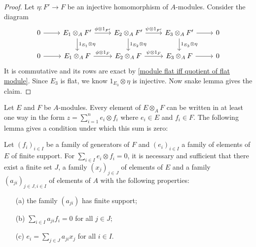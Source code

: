 \begin{proof}
Let $\eta:F'\to F$ be an injective homomorphism of $A$-modules. Consider the diagram
\[\begin{tikzcd}
0\ar[r]&E_1\otimes_AF'\ar[r,"\phi\otimes 1_{F'}"]\ar[d,"1_{E_1}\otimes\eta"]&E_2\otimes_AF'\ar[r,"\psi\otimes 1_{F'}"]\ar[d,"1_{E_2}\otimes\eta"]&E_3\otimes_AF'\ar[r]\ar[d,"1_{E_3}\otimes\eta"]&0\\
0\ar[r]&E_1\otimes_AF\ar[r,"\phi\otimes 1_{F}"]&E_2\otimes_AF\ar[r,"\psi\otimes 1_{F}"]&E_3\otimes_AF\ar[r]&0
\end{tikzcd}\]
It is commutative and its rows are exact by \cref{module flat iff quotient of flat module}. Since $E_3$ is flat, we know $1_{E_3}\otimes\eta$ is injective. Now snake lemma gives the claim.
\end{proof}
Let $E$ and $F$ be $A$-modules. Every element of $E\otimes_AF$ can be written in at least one way in the form $z=\sum_{i=1}^{n}e_i\otimes f_i$ where $e_i\in E$ and $f_i\in F$. The following lemma gives a condition under which this sum is zero:
\begin{lemma}\label{module tensor zero iff}
Let $(f_i)_{i\in I}$ be a family of generators of $F$ and $(e_i)_{i\in I}$ a family of elements of $E$ of finite support. For $\sum_{i\in I}e_i\otimes f_i=0$, it is necessary and sufficient that there exist a finite set $J$, a family $(x_j)_{j\in J}$ of elements of $E$ and a family $(a_{ji})_{j\in J,i\in I}$ of elements of $A$ with the following properties:
\begin{itemize}
\item[(a)] the family $(a_{ji})$ has finite support;
\item[(b)] $\sum_{i\in I}a_{ji}f_i=0$ for all $j\in J$;
\item[(c)] $e_i=\sum_{j\in J}a_{ji}x_j$ for all $i\in I$.
\end{itemize}
\end{lemma}
